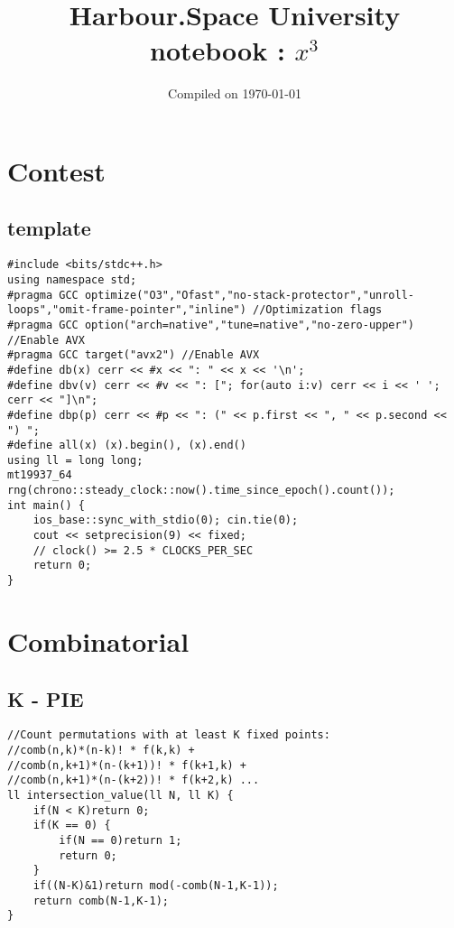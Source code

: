 \documentclass[landscape, 8pt, a4paper, oneside]{extarticle}
\title{Harbour.Space University notebook : $x^3$}
\date{Compiled on \today}
\begin{document}
{
    \Large

	\maketitle
}

\begin{multicols}{3}

{
\tableofcontents
}
\thispagestyle{fancy}
\pagebreak

\section{Contest}
\subsection{template}
\begin{verbatim}
#include <bits/stdc++.h>
using namespace std;
#pragma GCC optimize("O3","Ofast","no-stack-protector","unroll-loops","omit-frame-pointer","inline") //Optimization flags
#pragma GCC option("arch=native","tune=native","no-zero-upper") //Enable AVX
#pragma GCC target("avx2") //Enable AVX
#define db(x) cerr << #x << ": " << x << '\n';
#define dbv(v) cerr << #v << ": ["; for(auto i:v) cerr << i << ' ';  cerr << "]\n";
#define dbp(p) cerr << #p << ": (" << p.first << ", " << p.second << ") ";
#define all(x) (x).begin(), (x).end()
using ll = long long;
mt19937_64 rng(chrono::steady_clock::now().time_since_epoch().count());
int main() {
    ios_base::sync_with_stdio(0); cin.tie(0);
    cout << setprecision(9) << fixed;
    // clock() >= 2.5 * CLOCKS_PER_SEC
    return 0;
}
\end{verbatim}

\section{Combinatorial}
\subsection{K - PIE}
\begin{verbatim}
//Count permutations with at least K fixed points:
//comb(n,k)*(n-k)! * f(k,k) +
//comb(n,k+1)*(n-(k+1))! * f(k+1,k) +
//comb(n,k+1)*(n-(k+2))! * f(k+2,k) ...
ll intersection_value(ll N, ll K) {
    if(N < K)return 0;
    if(K == 0) {
        if(N == 0)return 1;
        return 0;
    }
    if((N-K)&1)return mod(-comb(N-1,K-1));
    return comb(N-1,K-1);
}
\end{verbatim}

\end{multicols}
\end{document}
